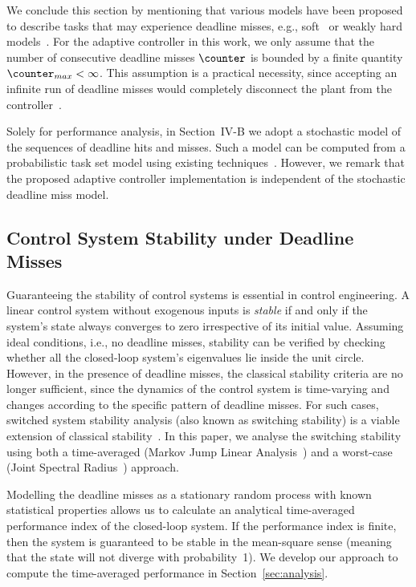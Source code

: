 We conclude this section by mentioning that various models have been proposed to describe tasks
that may experience deadline misses, e.g., soft~\cite{Marchand:2008} or weakly hard models~\cite{Bernat:2001, hammadeh:2017}.
For the adaptive controller in this work, we only assume that the number of consecutive deadline misses $\counter$ is bounded by a finite quantity $\counter_{max} < \infty$.
This assumption is a practical necessity, since accepting an infinite run of deadline misses would completely disconnect the plant from the controller~\cite{Maggio:2020}.

Solely for performance analysis, in Section~IV-B we adopt a stochastic model of the sequences of deadline hits and misses. 
Such a model can be computed from a probabilistic task set model using existing techniques~\cite{Chen:2017, Chen:2018, markovic:2021}. 
However, we remark that the proposed adaptive controller implementation is independent of the stochastic deadline miss model.

\subsection{Control System Stability under Deadline Misses}
\label{sec:stability}
Guaranteeing the stability of control systems is essential in control engineering.
A linear control system without exogenous inputs is \emph{stable} if and only if the system's state always converges to zero irrespective of its initial value.
Assuming ideal conditions, i.e., no deadline misses, stability can be verified by checking whether all the closed-loop system's eigenvalues lie inside the unit circle.
However, in the presence of deadline misses, the classical stability criteria are no longer sufficient, since the dynamics of the control system is time-varying and changes according to the specific pattern of deadline misses.
For such cases, switched system stability analysis (also known as switching stability) is a viable extension of classical stability~\cite{Liberzon:2003}.
In this paper, we analyse the switching stability using both a time-averaged (Markov Jump Linear Analysis~\cite{Fang:2002}) and a worst-case (Joint Spectral Radius~\cite{Rota:1960}) approach.

Modelling the deadline misses as a stationary random process with known statistical properties allows us to calculate an analytical time-averaged performance index of the closed-loop system.
If the performance index is finite, then the system is guaranteed to be stable in the mean-square sense (meaning that the state will not diverge with probability~1).
We develop our approach to compute the time-averaged performance in Section~\ref{sec:analysis}.

